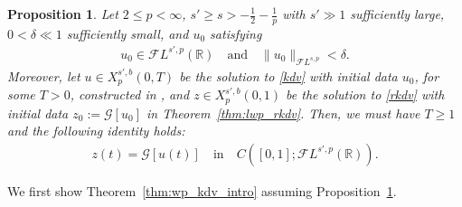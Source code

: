 \documentclass[a4paper,
11pt,  reqno]{amsart}
\newcommand{\5}{\textup{V}}
\newcommand{\FL}{\mathcal{F} L}
\newcommand{\dl}{\delta}
\newtheorem{proposition}[theorem]{Proposition}
\theoremstyle{remark}
\newcommand{\R}{\mathbb{R}}
\newcommand{\Gc}{\mathcal{G}}
\numberwithin{equation}{section}
\numberwithin{theorem}{section}
\begin{document}
\begin{proposition}\label{PRO:equiv}
Let $2 \le p < \infty$, $s' \ge s > - \frac12 - \frac1p$ with $s'\gg1$ sufficiently large, $0<\dl \ll 1$ sufficiently small, and $u_0$ satisfying
\begin{align}
\label{equiv-0}
u_0\in \FL^{s',p}(\R)
\quad
\text{and}
\quad
 \|u_0\|_{\FL^{s,p}}<\delta.
\end{align}
Moreover, let $u \in X^{s',b}_p(0,T)$ be the solution to \eqref{kdv} with initial data $u_0$, for some $T>0$, constructed in
\cite{Grunrock_ldv_hier}, and $z\in X^{s', b}_p(0,1)$ be the solution to
\eqref{rkdv} with initial data $z_0 := \Gc[u_0]$ in Theorem~\ref{thm:lwp_rkdv}.
Then, we must have $T \ge 1$ and the following identity holds:
\begin{align} \label{equiv-1}
z(t)=\Gc[u(t)]
\quad
\text{in}
\quad
C([0,1]; \FL^{s',p}(\R)).
\end{align}


\end{proposition}

We first show Theorem~\ref{thm:wp_kdv_intro} assuming Proposition~\ref{PRO:equiv}.
\end{document}
